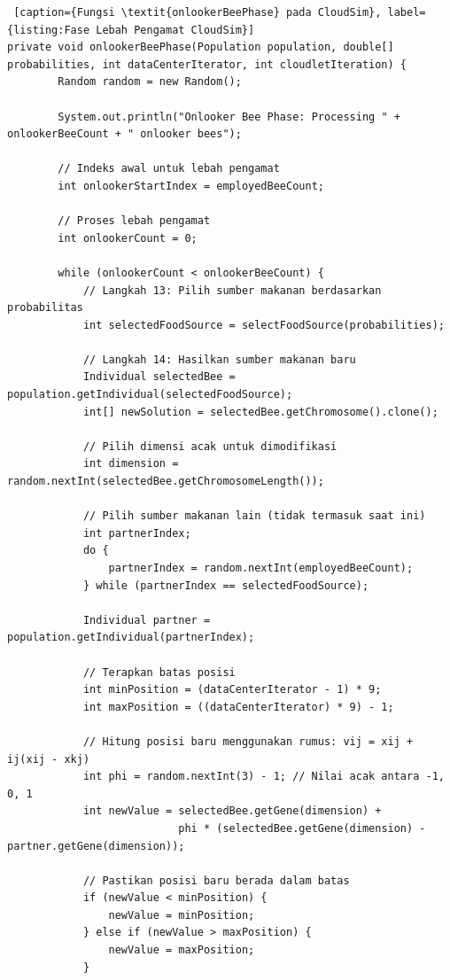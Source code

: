 \begin{lstlisting} [caption={Fungsi \textit{onlookerBeePhase} pada CloudSim}, label={listing:Fase Lebah Pengamat CloudSim}]
private void onlookerBeePhase(Population population, double[] probabilities, int dataCenterIterator, int cloudletIteration) {
        Random random = new Random();
        
        System.out.println("Onlooker Bee Phase: Processing " + onlookerBeeCount + " onlooker bees");
        
        // Indeks awal untuk lebah pengamat
        int onlookerStartIndex = employedBeeCount;
        
        // Proses lebah pengamat
        int onlookerCount = 0;
        
        while (onlookerCount < onlookerBeeCount) {
            // Langkah 13: Pilih sumber makanan berdasarkan probabilitas
            int selectedFoodSource = selectFoodSource(probabilities);
            
            // Langkah 14: Hasilkan sumber makanan baru
            Individual selectedBee = population.getIndividual(selectedFoodSource);
            int[] newSolution = selectedBee.getChromosome().clone();
            
            // Pilih dimensi acak untuk dimodifikasi
            int dimension = random.nextInt(selectedBee.getChromosomeLength());
            
            // Pilih sumber makanan lain (tidak termasuk saat ini)
            int partnerIndex;
            do {
                partnerIndex = random.nextInt(employedBeeCount);
            } while (partnerIndex == selectedFoodSource);
            
            Individual partner = population.getIndividual(partnerIndex);
            
            // Terapkan batas posisi
            int minPosition = (dataCenterIterator - 1) * 9;
            int maxPosition = ((dataCenterIterator) * 9) - 1;
            
            // Hitung posisi baru menggunakan rumus: vij = xij + ij(xij - xkj)
            int phi = random.nextInt(3) - 1; // Nilai acak antara -1, 0, 1
            int newValue = selectedBee.getGene(dimension) + 
                           phi * (selectedBee.getGene(dimension) - partner.getGene(dimension));
            
            // Pastikan posisi baru berada dalam batas
            if (newValue < minPosition) {
                newValue = minPosition;
            } else if (newValue > maxPosition) {
                newValue = maxPosition;
            }
            

\end{lstlisting}
